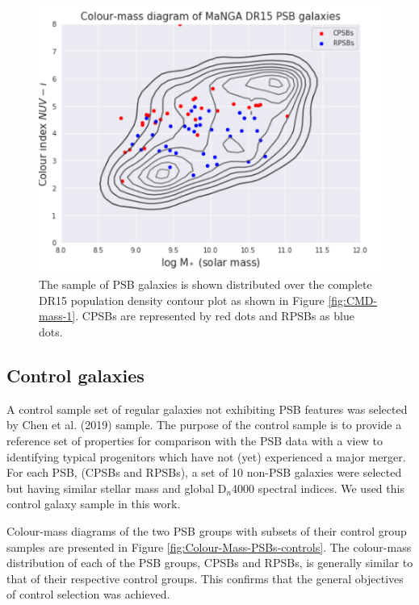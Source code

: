 \begin{figure}
    \centering
    \includegraphics[width=\columnwidth]{images/CMDs/Colour-Mass-DR15-PSBs.png}
    \caption[Colour-mass distribution of PSBs]{The sample of PSB galaxies is shown distributed over the complete DR15 population density contour plot as shown in Figure \ref{fig:CMD-mass-1}. CPSBs are represented by red dots and RPSBs as blue dots.}
    \label{fig:Colour-Mass-PSBs}
\end{figure}

\subsection{Control galaxies}
\label{sec:controls}
A control sample set of regular galaxies not exhibiting PSB features was selected by Chen et al. (2019) sample. The purpose of the control sample is to provide a reference set of properties for comparison with the PSB data with a view to identifying typical progenitors which have not (yet) experienced a major merger. For each PSB, (CPSBs and RPSBs), a set of 10 non-PSB galaxies were selected but having similar stellar mass and global D$_n$4000 spectral indices. We used this control galaxy sample in this work.

Colour-mass diagrams of the two PSB groups with subsets of their control group samples are presented in Figure \ref{fig:Colour-Mass-PSBs-controls}. The colour-mass distribution of each of the PSB groups, CPSBs and RPSBs, is generally similar to that of their respective control groups. This confirms that the general objectives of control selection was achieved.


